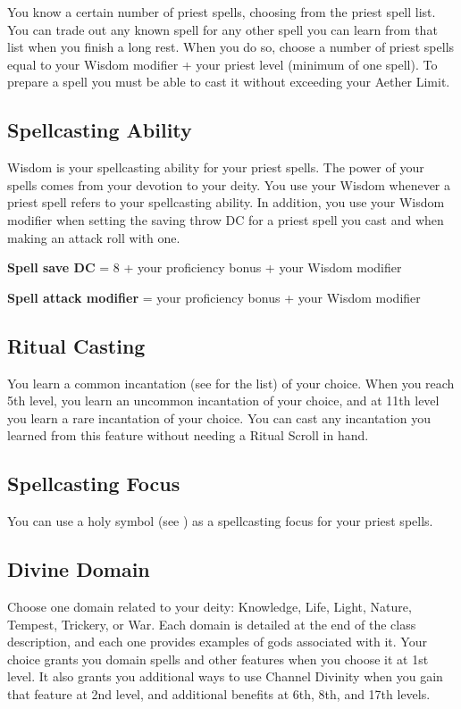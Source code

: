 You know a certain number of priest spells, choosing from the priest spell list. You can trade out any known spell for any other spell you can learn from that list when you finish a long rest. When you do so, choose a number of priest spells equal to your Wisdom modifier + your priest level (minimum of one spell). To prepare a spell you must be able to cast it without exceeding your Aether Limit.

\subsection{Spellcasting Ability}

Wisdom is your spellcasting ability for your priest spells. The power of your spells comes from your devotion to your deity. You use your Wisdom whenever a priest spell refers to your spellcasting ability. In addition, you use your Wisdom modifier when setting the saving throw DC for a priest spell you cast and when making an attack roll with one.

\textbf{Spell save DC} = 8 + your proficiency bonus + your Wisdom modifier

\textbf{Spell attack modifier} = your proficiency bonus + your Wisdom modifier

\subsection{Ritual Casting}

You learn a common incantation (see  for the list) of your choice. When you reach 5th level, you learn an uncommon incantation of your choice, and at 11th level you learn a rare incantation of your choice. You can cast any incantation you learned from this feature without needing a Ritual Scroll in hand.

\subsection{Spellcasting Focus}

You can use a holy symbol (see ) as a spellcasting focus for your priest spells.

\subsection{Divine Domain}

Choose one domain related to your deity: Knowledge, Life, Light, Nature, Tempest, Trickery, or War. Each domain is detailed at the end of the class description, and each one provides examples of gods associated with it. Your choice grants you domain spells and other features when you choose it at 1st level. It also grants you additional ways to use Channel Divinity when you gain that feature at 2nd level, and additional benefits at 6th, 8th, and 17th levels.

